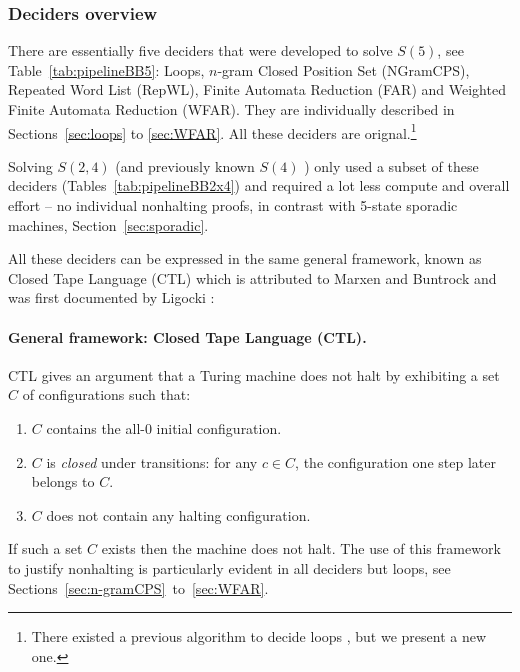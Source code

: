 \newpage

\subsubsection{Deciders overview}\label{sec:deciders-overview}

There are essentially five deciders that were developed to solve $S(5)$, see Table~\ref{tab:pipelineBB5}: Loops, $n$-gram Closed Position Set (NGramCPS), Repeated Word List (RepWL), Finite Automata Reduction (FAR) and Weighted Finite Automata Reduction (WFAR). They are individually described in Sections~\ref{sec:loops} to \ref{sec:WFAR}. All these deciders are orignal.\footnote{There existed a previous algorithm to decide loops \cite{Lin1963}, but we present a new one.}



Solving $S(2,4)$ (and previously known $S(4)$ \cite{Brady83}) only used  a subset of these deciders (Tables~\ref{tab:pipelineBB2x4}) and required a lot less compute and overall effort -- \eg no individual nonhalting proofs, in contrast with 5-state sporadic machines, Section~\ref{sec:sporadic}.

All these deciders can be expressed in the same general framework, known as Closed Tape Language (CTL) which is attributed to Marxen and Buntrock and was first documented by Ligocki \cite{ShawnCTL}:

\paragraph{General framework: Closed Tape Language (CTL).} CTL gives an argument that a Turing machine does not halt by exhibiting a set $C$ of configurations such that:
\begin{enumerate}
    \item $C$ contains the all-0 initial configuration.
    \item $C$ is \textit{closed} under transitions: for any $c \in C$, the configuration one step later belongs to $C$.
    \item $C$ does not contain any halting configuration.
\end{enumerate}


If such a set $C$ exists then the machine does not halt. The use of this framework to justify nonhalting is particularly evident in all deciders but loops, see Sections~\ref{sec:n-gramCPS}~to~\ref{sec:WFAR}.


